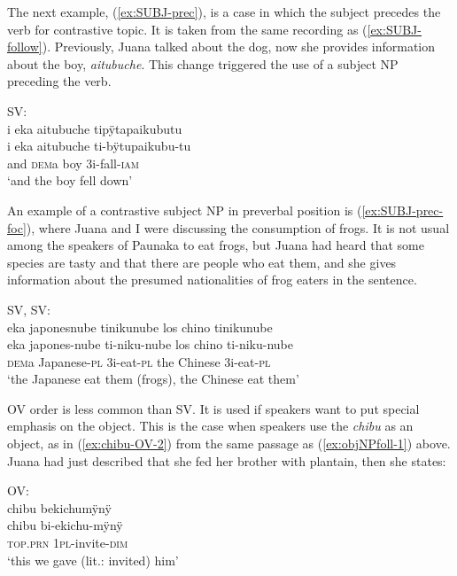 The next example, (\ref{ex:SUBJ-prec}), is a case in which the subject precedes the verb for contrastive topic. It is taken from the same recording as (\ref{ex:SUBJ-follow}). Previously, Juana talked about the dog, now she provides information about the boy, \textit{aitubuche}. This change triggered the use of a subject NP preceding the verb.

\ea\label{ex:SUBJ-prec}
\begingl 
\glpreamble  \textup{SV:}\\i eka aitubuche tipÿtapaikubutu\\
\gla i eka aitubuche ti-bÿtupaikubu-tu\\ 
\glb and \textsc{dem}a boy 3i-fall-\textsc{iam}\\ 
\glft ‘and the boy fell down’
\trailingcitation{[jxx-a120516l-a.148]}
\xe
{}

An example of a contrastive  subject NP in preverbal position is (\ref{ex:SUBJ-prec-foc}), where Juana and I were discussing the consumption of frogs. It is not usual among the speakers of Paunaka to eat frogs, but Juana had heard that some species are tasty and that there are people who eat them, and she gives information about the presumed nationalities of frog eaters in the sentence.


\ea\label{ex:SUBJ-prec-foc}
\begingl 
\glpreamble  \textup{SV, SV:}\\eka japonesnube tinikunube los chino tinikunube\\
\gla eka japones-nube ti-niku-nube {los chino} ti-niku-nube\\ 
\glb \textsc{dem}a Japanese-\textsc{pl} 3i-eat-\textsc{pl} {the Chinese} 3i-eat-\textsc{pl}\\ 
\glft ‘the Japanese eat them (frogs), the Chinese eat them’
\trailingcitation{[jxx-a120516l-a.482]}
\xe



OV order is less common than SV. It is used if speakers want to put special emphasis on the object. This is the case when speakers use the  \textit{chibu} as an object, as in (\ref{ex:chibu-OV-2}) from the same passage as (\ref{ex:objNPfoll-1}) above. Juana had just described that she fed her brother with plantain, then she states:

\ea\label{ex:chibu-OV-2}
\begingl
\glpreamble  \textup{OV:}\\chibu bekichumÿnÿ\\
\gla chibu bi-ekichu-mÿnÿ\\
\textsc{top.prn} 1\textsc{pl}-invite-\textsc{dim}\\
\glft ‘this we gave (lit.: invited) him’
\endgl
\trailingcitation{[jxx-p120430l-2.482]}
\xe


